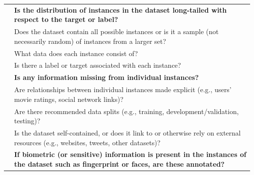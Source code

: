 \documentclass[journal]{IEEEtran}
\begin{document}
\begin{table}[]
\begin{tabular}{|p{}|p{}|}
                                                 & \textbf{Is the distribution of instances in the dataset long-tailed  with respect to the target or label?}                                                                                                                \\
                                                 & Does the dataset contain all possible instances or is it a sample (not necessarily random) of instances from a larger set?                                                                                                \\
                                                 & What data does each instance consist of?                                                                                                                                                                                  \\
                                                 & Is there a label or target associated with each instance?                                                                                                                                                                 \\
                                                 & \textbf{Is any information missing from individual instances?}                                                                                                                                                            \\
                                                 & Are relationships between individual instances made explicit (e.g., users’ movie ratings, social network links)?                                                                                                          \\
                                                 & Are there recommended data splits (e.g., training, development/validation, testing)?                                                                                                                                      \\
                                                 & Is the dataset self-contained, or does it link to or otherwise rely on external resources (e.g., websites, tweets, other datasets)?                                                                                       \\
                                                 & \textbf{If biometric (or sensitive) information is present in the instances of the dataset such as fingerprint or faces, are these annotated?}                                                                            \\

\end{tabular}
\end{table}
\end{document}
